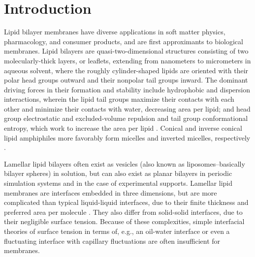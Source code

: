 \documentclass[9pt,bestpractices]{livecoms}
\begin{document}
\section{Introduction}
\label{sec:intro}
Lipid bilayer membranes have diverse applications in soft matter physics, pharmacology, and consumer products, and are first approximants to biological membranes.
Lipid bilayers are quasi-two-dimensional structures consisting of two molecularly-thick layers, or leaflets, extending from nanometers to micrometers in aqueous solvent, where the roughly cylinder-shaped lipids are oriented with their polar head groups outward and their nonpolar tail groups inward.
The dominant driving forces in their formation and stability include hydrophobic and dispersion interactions, wherein the lipid tail groups maximize their contacts with each other and minimize their contacts with water, decreasing area per lipid; and head group electrostatic and excluded-volume repulsion and tail group conformational entropy, which work to increase the area per lipid \cite{Ben-Shaul1995}.
Conical and inverse conical lipid amphiphiles more favorably form micelles and inverted micelles, respectively \cite{Israelachvili2011}.

Lamellar lipid bilayers often exist as vesicles (also known as liposomes--basically bilayer spheres) in solution, but can also exist as planar bilayers in periodic simulation systems and in the case of experimental supports.
Lamellar lipid membranes are interfaces embedded in three dimensions, but are more complicated than typical liquid-liquid interfaces, due to their finite thickness and preferred area per molecule \cite{Diamant2011,Safran1994}.
They also differ from solid-solid interfaces, due to their negligible surface tension.
Because of these complexities, simple interfacial theories of surface tension in terms of, e.g., an oil-water interface or even a fluctuating interface with capillary fluctuations are often insufficient for membranes.
\end{document}
